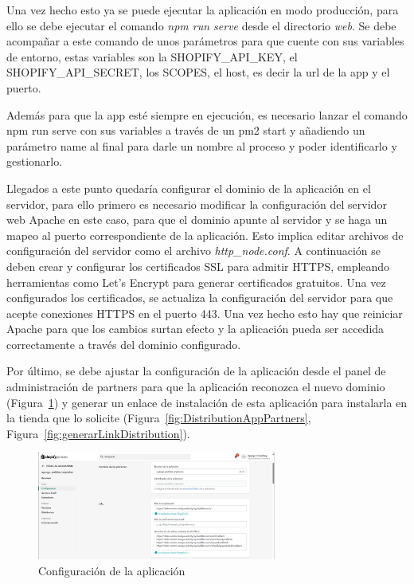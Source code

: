 \documentclass[11pt]{article}
\begin{document}
Una vez hecho esto ya se puede ejecutar la aplicación en modo producción, para ello se debe ejecutar el comando \textit{npm run serve} desde el directorio \textit{web}. Se debe acompañar
a este comando de unos parámetros para que cuente con sus variables de entorno, estas variables son la SHOPIFY\_API\_KEY, el SHOPIFY\_API\_SECRET, los SCOPES,  el host, es decir la url de la app y el puerto.

Además para que la app esté siempre en ejecución, es necesario lanzar el comando npm run serve con sus variables a través de un pm2 start y añadiendo un parámetro name al final para
darle un nombre al proceso y poder identificarlo y gestionarlo. 

Llegados a este punto quedaría configurar el dominio de la aplicación en el servidor, para ello primero es necesario modificar la configuración del servidor web Apache en este caso, para que 
el dominio apunte al servidor y se haga un mapeo al puerto correspondiente de la aplicación. Esto implica editar archivos de configuración del servidor como el archivo \textit{http\_node.conf}. 
A continuación se deben crear y configurar los certificados SSL para admitir HTTPS, empleando herramientas como Let's Encrypt para generar certificados gratuitos. Una vez configurados los
certificados, se actualiza la configuración del servidor para que acepte conexiones HTTPS en el puerto 443. Una vez hecho esto hay que reiniciar Apache para que los cambios surtan
efecto y la aplicación pueda ser accedida correctamente a través del dominio configurado.

Por último, se debe ajustar la configuración de la aplicación desde el panel de administración de partners para que la aplicación reconozca el nuevo dominio (Figura~\ref{fig:ConfiguracionAppPartners}) y generar un enlace de instalación de esta aplicación
para instalarla en la tienda que lo solicite (Figura~\ref{fig:DistributionAppPartners}, Figura~\ref{fig:generarLinkDistribution}).

\begin{figure}[H]
    \centering
    \includegraphics[width=0.7\textwidth]{imagenes/panelPartnersDistribution.png}
    \caption{\label{fig:ConfiguracionAppPartners}Configuración de la aplicación}
    \vspace{\fill}
\end{figure}
\end{document}
